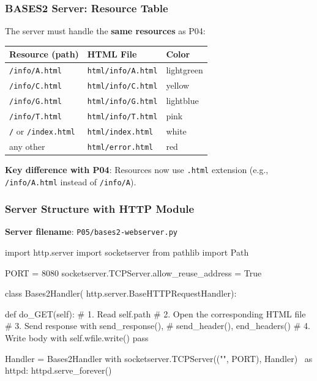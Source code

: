 \documentclass[xcolor=table]{beamer}
\begin{document}
\begin{frame}
\frametitle{BASES2 Server: Resource Table}

The server must handle the \textbf{same resources} as P04:

\vspace{0.2cm}

\begingroup\small
\begin{center}
\begin{tabular}{|l|l|l|}
\hline
\textbf{Resource (path)} & \textbf{HTML File} & \textbf{Color} \\
\hline
\texttt{/info/A.html} & \texttt{html/info/A.html} & lightgreen \\
\hline
\texttt{/info/C.html} & \texttt{html/info/C.html} & yellow \\
\hline
\texttt{/info/G.html} & \texttt{html/info/G.html} & lightblue \\
\hline
\texttt{/info/T.html} & \texttt{html/info/T.html} & pink \\
\hline
\texttt{/} or \texttt{/index.html} & \texttt{html/index.html} & white \\
\hline
any other & \texttt{html/error.html} & red \\
\hline
\end{tabular}
\end{center}
\endgroup

\vspace{0.2cm}

\textbf{Key difference with P04}: Resources now use \texttt{.html} extension (e.g., \texttt{/info/A.html} instead of \texttt{/info/A}).

\end{frame}

\begin{frame}[fragile]
\frametitle{Server Structure with HTTP Module}

\textbf{Server filename}: \texttt{P05/bases2-webserver.py}

\vspace{0.1cm}

\begin{python}
import http.server
import socketserver
from pathlib import Path

PORT = 8080
socketserver.TCPServer.allow_reuse_address = True

class Bases2Handler(
        http.server.BaseHTTPRequestHandler):

    def do_GET(self):
        # 1. Read self.path
        # 2. Open the corresponding HTML file
        # 3. Send response with send_response(),
        #    send_header(), end_headers()
        # 4. Write body with self.wfile.write()
        pass

Handler = Bases2Handler
with socketserver.TCPServer(("", PORT), Handler) \
        as httpd:
    httpd.serve_forever()
\end{python}

\end{frame}
\end{document}
